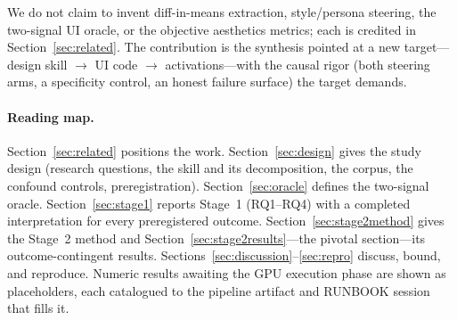 \noindent
We do not claim to invent diff-in-means extraction, style/persona steering, the two-signal UI
oracle, or the objective aesthetics metrics; each is credited in Section~\ref{sec:related}. The
contribution is the synthesis pointed at a new target---design skill $\rightarrow$ UI code
$\rightarrow$ activations---with the causal rigor (both steering arms, a specificity control, an
honest failure surface) the target demands.

\paragraph{Reading map.} Section~\ref{sec:related} positions the work. Section~\ref{sec:design}
gives the study design (research questions, the skill and its decomposition, the corpus, the
confound controls, preregistration). Section~\ref{sec:oracle} defines the two-signal oracle.
Section~\ref{sec:stage1} reports Stage~1 (RQ1--RQ4) with a completed interpretation for every
preregistered outcome. Section~\ref{sec:stage2method} gives the Stage~2 method and
Section~\ref{sec:stage2results}---the pivotal section---its outcome-contingent results.
Sections~\ref{sec:discussion}--\ref{sec:repro} discuss, bound, and reproduce.
Numeric results awaiting the GPU execution phase are shown as  placeholders,
each catalogued to the pipeline artifact and RUNBOOK session that fills it.
